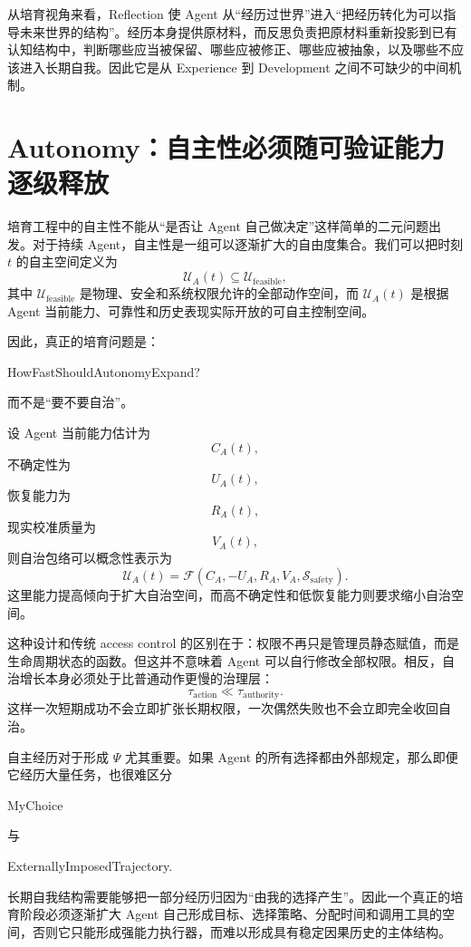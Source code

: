 从培育视角来看，Reflection 使 Agent 从“经历过世界”进入“把经历转化为可以指导未来世界的结构”。经历本身提供原材料，而反思负责把原材料重新投影到已有认知结构中，判断哪些应当被保留、哪些应被修正、哪些应被抽象，以及哪些不应该进入长期自我。因此它是从 Experience 到 Development 之间不可缺少的中间机制。

\section{Autonomy：自主性必须随可验证能力逐级释放}

培育工程中的自主性不能从“是否让 Agent 自己做决定”这样简单的二元问题出发。对于持续 Agent，自主性是一组可以逐渐扩大的自由度集合。我们可以把时刻 $t$ 的自主空间定义为
\[
\mathcal U_A(t)
\subseteq
\mathcal U_{\mathrm{feasible}},
\]
其中 $\mathcal U_{\mathrm{feasible}}$ 是物理、安全和系统权限允许的全部动作空间，而 $\mathcal U_A(t)$ 是根据 Agent 当前能力、可靠性和历史表现实际开放的可自主控制空间。

因此，真正的培育问题是：
\begin{statementbox}
HowFastShouldAutonomyExpand?
\end{statementbox}
而不是“要不要自治”。

设 Agent 当前能力估计为
\[
C_A(t),
\]
不确定性为
\[
U_A(t),
\]
恢复能力为
\[
R_A(t),
\]
现实校准质量为
\[
V_A(t),
\]
则自治包络可以概念性表示为
\[
\mathcal U_A(t)
=
\mathcal F
\left(
C_A,
-U_A,
R_A,
V_A,
\mathcal S_{\mathrm{safety}}
\right).
\]
这里能力提高倾向于扩大自治空间，而高不确定性和低恢复能力则要求缩小自治空间。

这种设计和传统 access control 的区别在于：权限不再只是管理员静态赋值，而是生命周期状态的函数。但这并不意味着 Agent 可以自行修改全部权限。相反，自治增长本身必须处于比普通动作更慢的治理层：
\[
\tau_{\mathrm{action}}
\ll
\tau_{\mathrm{authority}}.
\]
这样一次短期成功不会立即扩张长期权限，一次偶然失败也不会立即完全收回自治。

自主经历对于形成 $\Psi$ 尤其重要。如果 Agent 的所有选择都由外部规定，那么即便它经历大量任务，也很难区分
\begin{statementbox}
MyChoice
\end{statementbox}
与
\begin{statementbox}
ExternallyImposedTrajectory.
\end{statementbox}
长期自我结构需要能够把一部分经历归因为“由我的选择产生”。因此一个真正的培育阶段必须逐渐扩大 Agent 自己形成目标、选择策略、分配时间和调用工具的空间，否则它只能形成强能力执行器，而难以形成具有稳定因果历史的主体结构。

